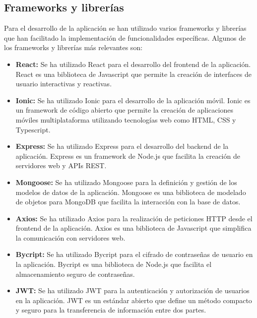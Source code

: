 \subsection{Frameworks y librerías}
Para el desarrollo de la aplicación se han utilizado varios frameworks y librerías que han facilitado la implementación de funcionalidades específicas. Algunos de los frameworks y librerías más relevantes son:
\begin {itemize}
\item {\bfseries React:} Se ha utilizado React para el desarrollo del frontend de la aplicación. React es una biblioteca de Javascript que permite la creación de interfaces de usuario interactivas y reactivas.
\item {\bfseries Ionic:} Se ha utilizado Ionic para el desarrollo de la aplicación móvil. Ionic es un framework de código abierto que permite la creación de aplicaciones móviles multiplataforma utilizando tecnologías web como HTML, CSS y Typescript.
\item {\bfseries Express:} Se ha utilizado Express para el desarrollo del backend de la aplicación. Express es un framework de Node.js que facilita la creación de servidores web y APIs REST.
\item {\bfseries Mongoose:} Se ha utilizado Mongoose para la definición y gestión de los modelos de datos de la aplicación. Mongoose es una biblioteca de modelado de objetos para MongoDB que facilita la interacción con la base de datos.
\item {\bfseries Axios:} Se ha utilizado Axios para la realización de peticiones HTTP desde el frontend de la aplicación. Axios es una biblioteca de Javascript que simplifica la comunicación con servidores web.
\item {\bfseries Bycript:} Se ha utilizado Bycript para el cifrado de contraseñas de usuario en la aplicación. Bycript es una biblioteca de Node.js que facilita el almacenamiento seguro de contraseñas.
\item {\bfseries JWT:} Se ha utilizado JWT para la autenticación y autorización de usuarios en la aplicación. JWT es un estándar abierto que define un método compacto y seguro para la transferencia de información entre dos partes.
\end {itemize}

